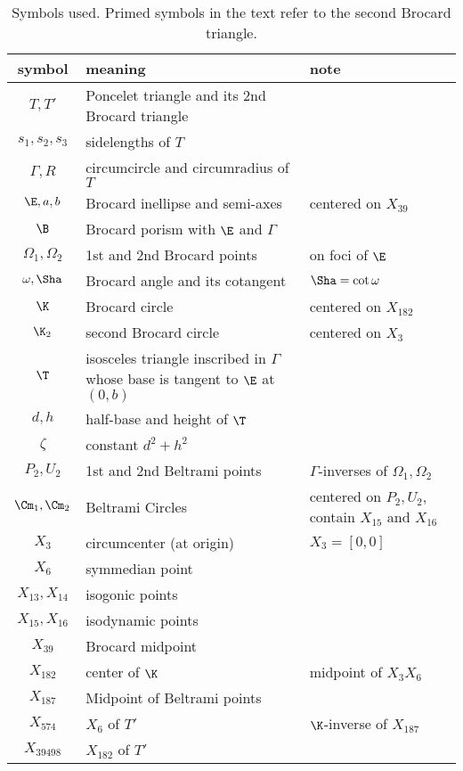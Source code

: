 \begin{table}[H]
\small
\begin{tabular}{|c|l|l|}
\hline
symbol & meaning & note \\
\hline
$T,T'$ & Poncelet triangle and its 2nd Brocard triangle & \\
$s_1,s_2,s_3$ & sidelengths of $T$ & \\
$\Gamma,R$ & circumcircle and circumradius of $T$ & \\
$\E,a,b$ & Brocard inellipse and semi-axes & centered on $X_{39}$\\
$\B$ & Brocard porism with $\E$ and $\Gamma$ & \\
$\Omega_1,\Omega_2$ & 1st and 2nd Brocard points & on foci of $\E$ \\
$\omega,\Sha$ & Brocard angle and its cotangent & $\Sha=\cot\omega$\\
$\K$ & Brocard circle & centered on $X_{182}$ \\
$\K_2$ & second Brocard circle  & centered on $X_3$ \\
$\T$ & \makecell[lt]{isosceles triangle inscribed in $\Gamma$ \\ whose base is tangent to $\E$ at $(0,b)$} & \\ 
$d,h$ & half-base and height of $\T$ & \\
$\zeta$ & constant $d^2+h^2$ & \\
$P_2,U_2$ & 1st and 2nd Beltrami points & $\Gamma$-inverses of $\Omega_1,\Omega_2$ \\
$\Cm_1,\Cm_2$ & Beltrami Circles &\makecell[lt]{centered on $P_2,U_2$,\\ contain $X_{15}$ and $X_{16}$} \\
\hline
$X_{3}$ & circumcenter (at origin) & $X_3=[0,0]$\\
$X_{6}$ & symmedian point & \\
$X_{13},X_{14}$ & isogonic points & \\
$X_{15},X_{16}$ & isodynamic points & \\
$X_{39}$ & Brocard midpoint & \\
$X_{182}$ & center of $\K$ & midpoint of $X_3 X_6$ \\
$X_{187}$ & Midpoint of Beltrami points & \\
$X_{574}$ & $X_6$ of $T'$ & $\K$-inverse of $X_{187}$\\
$X_{39498}$ & $X_{182}$ of $T'$ & \\
\hline
\end{tabular}
\caption{Symbols used. Primed symbols in the text refer to the second Brocard triangle.}
\label{tab:symbols}
\end{table}
